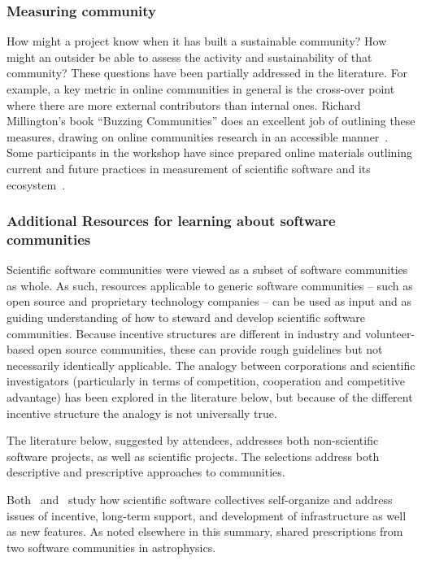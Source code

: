 \documentclass[11pt, oneside]{amsart}
\newcommand{\katznote}[1]{ {\textcolor{magenta}    { ***Dan:      #1 }}}
\begin{document}
\subsubsection{Measuring community}
How might a project know when it has built a sustainable community?  How might an outsider be able to assess the activity and sustainability of that community?  These questions have been partially addressed in the literature.  For example, a key metric in online communities in general is the cross-over point where there are more external contributors than internal ones. Richard Millington's book ``Buzzing Communities'' does an excellent job of outlining these measures, drawing on online communities research in an accessible manner~\cite{millington_buzzing_2012}. Some participants in the workshop have since prepared online materials outlining current and future practices in measurement of scientific software and its ecosystem~\cite{metrics-web}.

\subsubsection{Additional Resources for learning about software communities}

Scientific software communities were viewed as a subset of software communities
as whole.  As such, resources applicable to generic software communities --
such as open source and proprietary technology companies -- can be used as
input and as guiding understanding of how to steward and develop scientific
software communities.  Because incentive structures are different in industry
and volunteer-based open source communities, these can provide rough guidelines
but not necessarily identically applicable.  The analogy between corporations
and scientific investigators (particularly in terms of competition, cooperation
and competitive advantage) has been explored in the literature below, but
because of the different incentive structure the analogy is not universally
true.

The literature below, suggested by attendees, addresses both non-scientific
software projects, as well as scientific projects.  The selections address both
descriptive and prescriptive approaches to communities.

Both~\cite{howison_scientific_2011} and~\cite{howison_incentives_2013}
study how scientific software collectives self-organize and address issues of
incentive, long-term support, and development of infrastructure as well as new
features.  As noted elsewhere in this summary,
\cite{Turk:2013:SCH:2484762.2484782} shared prescriptions from two software
communities in astrophysics.
\end{document}
